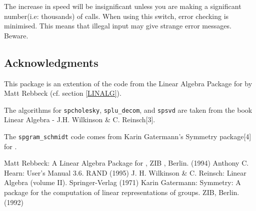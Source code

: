 The increase in speed will be insignificant unless you are making a 
significant number(i.e: thousands) of calls. When using this switch, 
error checking is minimised. This means that illegal input may give
strange error messages. Beware.

\subsection{Acknowledgments}
This package is an extention of the code from the Linear Algebra Package
for \REDUCE{} by Matt Rebbeck (cf. section \ref{LINALG}).

The algorithms for \texttt{spcholesky}, \texttt{splu\_decom}, and \texttt{spsvd} are 
taken from the book Linear Algebra - J.H. Wilkinson \& C. Reinsch[3].

The \texttt{spgram\_schmidt} code comes from Karin Gatermann's Symmetry 
package[4] for {\REDUCE}.


\begin{thebibliography}{9}
 Matt Rebbeck: A Linear Algebra Package for {\REDUCE}, ZIB
, Berlin. (1994)
 Anthony C. Hearn: {\REDUCE} User's Manual 3.6.
	RAND (1995)
 J. H. Wilkinson \& C. Reinsch: Linear Algebra 
(volume II). Springer-Verlag (1971)
 Karin Gatermann: Symmetry: A {\REDUCE} package for the 
computation of linear representations of groups. ZIB, Berlin. (1992)
\end{thebibliography}
